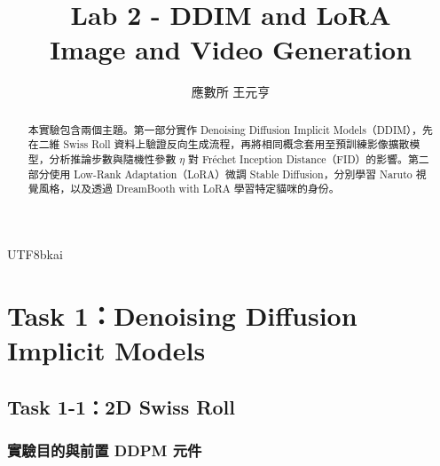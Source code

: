 \documentclass[11pt,a4paper]{article}
\author{應數所 \quad 王元亨 \quad 315652003}
\date{}
\title{#1 \\[0.5em] Image and Video Generation}
\newcommand{\reporttitle}[1]{
  \title{#1 \\[0.5em] Image and Video Generation}
  \maketitle
}
\begin{document}
\begin{CJK*}{UTF8}{bkai}

\reporttitle{\textbf{Lab 2 - DDIM and LoRA}}
\vspace{1em}
\begin{abstract}
本實驗包含兩個主題。第一部分實作 Denoising Diffusion Implicit Models（DDIM），先在二維 Swiss Roll 資料上驗證反向生成流程，再將相同概念套用至預訓練影像擴散模型，分析推論步數與隨機性參數 $\eta$ 對 Fr\'echet Inception Distance（FID）的影響。第二部分使用 Low-Rank Adaptation（LoRA）微調 Stable Diffusion，分別學習 Naruto 視覺風格，以及透過 DreamBooth with LoRA 學習特定貓咪的身份。
\end{abstract}
\vspace{1.5em}
\tableofcontents
\clearpage

\section{Task 1：Denoising Diffusion Implicit Models}

\subsection{Task 1-1：2D Swiss Roll}

\subsubsection{實驗目的與前置 DDPM 元件}


\end{CJK*}
\end{document}
